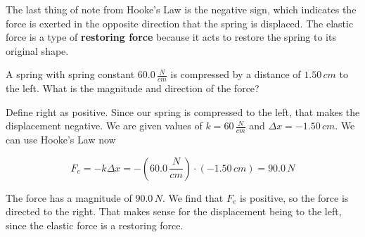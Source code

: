 \documentclass[12pt]{book}
\begin{document}
The last thing of note from Hooke's Law is the negative sign, which indicates the force is exerted in the opposite direction that the spring is displaced. The elastic force is a type of \textbf{restoring force} because it acts to restore the spring to its original shape.

\pagebreak

\begin{exampleblock}

A spring with spring constant $60.0 \, \frac{N}{cm}$ is compressed by a distance of $1.50 \, cm$ to the left. What is the magnitude and direction of the force?

\hspace{10pt}

Define right as positive. Since our spring is compressed to the left, that makes the displacement negative. We are given values of $k = 60 \, \frac{N}{cm}$ and $\Delta x = - 1.50 \, cm$. We can use Hooke's Law  now

\begin{equation}
F_e = -k \Delta x = -(60.0 \, \frac{N}{cm}) \cdot (-1.50 \, cm) = 90.0 \, N
\end{equation}

The force has a magnitude of $90.0 \, N$. We find that $F_e$ is positive, so the force is directed to the right. That makes sense for the displacement being to the left, since the elastic force is a restoring force.

\end{exampleblock}
\end{document}
